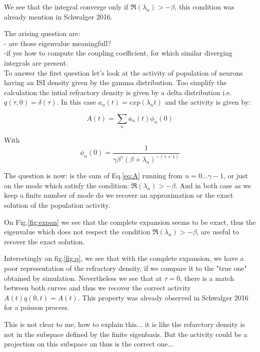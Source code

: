 \documentclass[a4paper,12pt,twoside]{article}
\begin{document}
We see that the integral converge only if $\Re(\lambda_n)>-\beta$, this condition was already mention in Schwalger 2016.

The arising question are: \\
- are those eigenvalue meaningfull? \\
-if yes how to compute the coupling coefficient, for which similar diverging integrals are present.\\

To answer the first question let's look at the activity of population of neurons having an ISI density given by the gamma distribution. Too simplify the calculation the intial refractory density is given by a delta distribution i.e. $q(\tau,0)=\delta(\tau)$. In this case
$a_n(t)=exp(\lambda_n t )$ and the activity is given by:

\begin{equation}
\label{eq:A}
A(t)=\sum_n a_n(t)\phi_n(0)
\end{equation}

With 
\begin{equation}
\label{eq:phi0}
\phi_n(0)=\frac{1}{\gamma\beta^\gamma(\beta+\lambda_n)^{-(\gamma+1)}}
\end{equation}

The question is now:  is the sum  of Eq.\eqref{eq:A} running from $n=0 ...\gamma -1$, or just on the mode which satisfy the condition: $\Re(\lambda_n)>-\beta$. And in both case as we keep a finite number of mode do we recover an approximation or the exact solution of the population activity.

On Fig.\ref{fig:expan} we see that the complete expansion seems to be exact, thus the eigenvalue  which does not respect the condition $\Re(\lambda_n)>-\beta$, are useful to recover the exact solution.

Interestingly on fig.\ref{fig:q}, we see that with the complete expansion, we have a poor representation of the refractory density, if we compare it to the "true one" obtained by simulation. Nevertheless we see that at $\tau=0$, there is a match between both curves and thus we recover the correct activity $A(t)q(0,t)=A(t)$. This property was already observed in Schwalger 2016  for a poisson process.

This is not clear to me, how to explain this... it is like the refarctory density is not  in the subspace defined by the finite  eigenbasis. But the activity could be a projection on this subspace an thus is the correct one...
\end{document}
